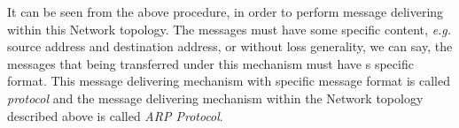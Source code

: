 \documentclass[10pt,a4paper]{article}
\begin{document}
It can be seen from the above procedure, in order to perform message delivering within this Network topology. The messages must have some specific content, \textsl{e.g.} source address and destination address, or without loss generality, we can say, the messages that being transferred under this mechanism must have s specific format. This message delivering mechanism with specific message format is called \textit{protocol} and the message delivering mechanism within the Network topology described above is called \textit{ARP Protocol}.

 
\end{document}
